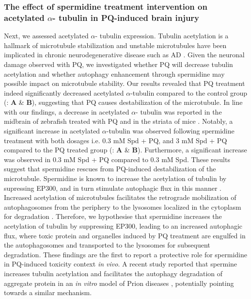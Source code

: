 \subsubsection{The effect of spermidine treatment intervention on acetylated $\alpha$- tubulin in PQ-induced brain injury}
Next, we assessed acetylated $\alpha$- tubulin expression. Tubulin acetylation is a hallmark of microtubule stabilization and unstable microtubules have been implicated in chronic neurodegenerative disease such as AD \citep{Phadwal2018}. Given the neuronal damage observed with PQ, we investigated whether PQ will decrease tubulin acetylation and whether autophagy enhancement through spermidine may possible impact on microtubule stability. Our results revealed that PQ treatment indeed significantly decreased acetylated $\alpha$-tubulin compared to the control group (: \textbf{A} \& \textbf{B}), suggesting that PQ causes destabilization of the microtubule. In line with our findings, a decrease in acetylated $\alpha$- tubulin was reported in the midbrain of zebrafish treated with PQ \citep{Pinho2019} and in the striata of mice \citep{Wills2012}. Notably, a significant increase in acetylated $\alpha$-tubulin was observed following spermidine treatment with both dosages i.e. 0.3 mM Spd + PQ, and 3 mM Spd + PQ compared to the PQ treated group (: \textbf{A} \& \textbf{B}). Furthermore, a significant increase was observed in 0.3 mM Spd + PQ compared to 0.3 mM Spd. These results suggest that spermidine rescues from PQ-induced destabilization of the microtubule. Spermidine is known to increase the acetylation of tubulin by supressing EP300, and in turn stimulate autophagic flux in this manner \citep{Madeo2018}. Increased acetylation of microtubules facilitates the retrograde mobilization of autophagosomes from the periphery to the lysosomes localized in the cytoplasm for degradation \citep{Phadwal2018,Xie2010}. Therefore, we hypothesise that spermidine increases the acetylation of tubulin by suppressing EP300, leading to an increased autophagic flux, where toxic protein and organelles induced by PQ treatment are engulfed in the autophagosomes and transported to the lysosomes for subsequent degradation. These findings are the first to report a protective role for spermidine in PQ-induced toxicity context \textit{in vivo}. A recent study reported that spermine increases tubulin acetylation and facilitates the autophagy degradation of aggregate protein in an \textit{in vitro} model of Prion diseases \citep{Phadwal2018}, potentially pointing towards a similar mechanism.

